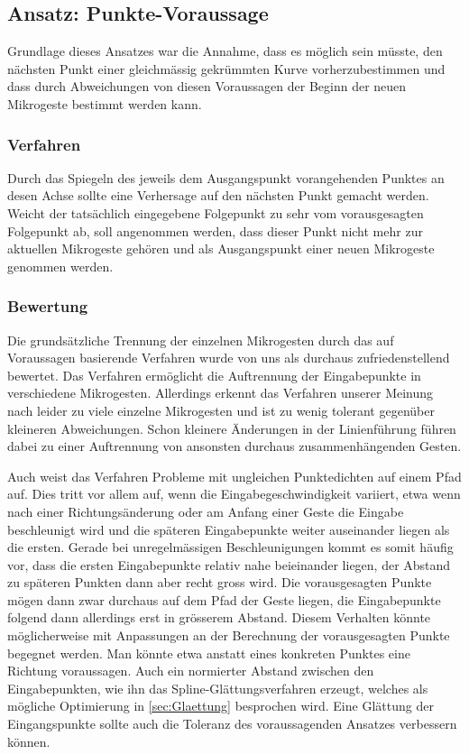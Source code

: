 \subsection{Ansatz: Punkte-Voraussage}
Grundlage dieses Ansatzes war die Annahme, dass es möglich sein müsste, den nächsten Punkt einer gleichmässig gekrümmten Kurve vorherzubestimmen und dass durch Abweichungen von diesen Voraussagen der Beginn der neuen Mikrogeste bestimmt werden kann.

\subsubsection{Verfahren}
Durch das Spiegeln des jeweils dem Ausgangspunkt vorangehenden Punktes an desen Achse sollte eine Verhersage auf den nächsten Punkt gemacht werden. Weicht der tatsächlich eingegebene Folgepunkt zu sehr vom vorausgesagten Folgepunkt ab, soll angenommen werden, dass dieser Punkt nicht mehr zur aktuellen Mikrogeste gehören und als Ausgangspunkt einer neuen Mikrogeste genommen werden.

\subsubsection{Bewertung}
Die grundsätzliche Trennung der einzelnen Mikrogesten durch das auf Voraussagen basierende Verfahren wurde von uns als durchaus zufriedenstellend bewertet. Das Verfahren ermöglicht die Auftrennung der Eingabepunkte in verschiedene Mikrogesten. Allerdings erkennt das Verfahren unserer Meinung nach leider zu viele einzelne Mikrogesten und ist zu wenig tolerant gegenüber kleineren Abweichungen. Schon kleinere Änderungen in der Linienführung führen dabei zu einer Auftrennung von ansonsten durchaus zusammenhängenden Gesten.

Auch weist das Verfahren Probleme mit ungleichen Punktedichten auf einem Pfad auf. Dies tritt vor allem auf, wenn die Eingabegeschwindigkeit variiert, etwa wenn nach einer Richtungsänderung oder am Anfang einer Geste die Eingabe beschleunigt wird und die späteren Eingabepunkte weiter auseinander liegen als die ersten. Gerade bei unregelmässigen Beschleunigungen kommt es somit häufig vor, dass die ersten Eingabepunkte relativ nahe beieinander liegen, der Abstand zu späteren Punkten dann aber recht gross wird. Die vorausgesagten Punkte mögen dann zwar durchaus auf dem Pfad der Geste liegen, die Eingabepunkte folgend dann allerdings erst in grösserem Abstand. Diesem Verhalten könnte möglicherweise mit Anpassungen an der Berechnung der vorausgesagten Punkte begegnet werden. Man könnte etwa anstatt eines konkreten Punktes eine Richtung voraussagen. Auch ein normierter Abstand zwischen den Eingabepunkten, wie ihn das Spline-Glättungsverfahren erzeugt, welches als mögliche Optimierung in \ref{sec:Glaettung} besprochen wird. Eine Glättung der Eingangspunkte sollte auch die Toleranz des voraussagenden Ansatzes verbessern können.

